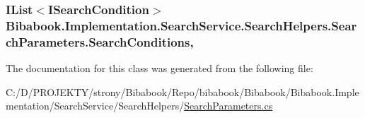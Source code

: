 \subsubsection[{Search\+Conditions}]{\setlength{\rightskip}{0pt plus 5cm}I\+List$<${\bf I\+Search\+Condition}$>$ Bibabook.\+Implementation.\+Search\+Service.\+Search\+Helpers.\+Search\+Parameters.\+Search\+Conditions\hspace{0.3cm}{\ttfamily [get]}, {\ttfamily [set]}}\label{class_bibabook_1_1_implementation_1_1_search_service_1_1_search_helpers_1_1_search_parameters_a413a985ac5992f1bb35aa0ea74ce80ab}


The documentation for this class was generated from the following file\+:\begin{DoxyCompactItemize}
\item 
C\+:/\+D/\+P\+R\+O\+J\+E\+K\+T\+Y/strony/\+Bibabook/\+Repo/bibabook/\+Bibabook/\+Bibabook.\+Implementation/\+Search\+Service/\+Search\+Helpers/\hyperlink{_search_parameters_8cs}{Search\+Parameters.\+cs}\end{DoxyCompactItemize}
